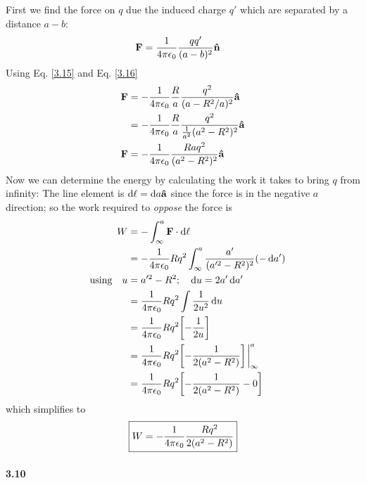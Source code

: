 \documentclass[../main.tex]{subfiles}
\begin{document}
\begin{itemize}
    First we find the force on $q$ due the induced charge $q'$ which are separated by a distance $a - b$:
    \begin{align*}
        \vb F &= \frac{1}{4\pi\epsilon_0} \frac{qq'}{(a - b)^2} \vu n
    \end{align*}
    Using Eq. \eqref{3.15} and Eq. \eqref{3.16}
    \begin{align*}
        \vb F &= -\frac{1}{4\pi\epsilon_0} \frac{R}{a} \frac{q^2}{(a - R^2 / a)^2} \vu a \\ 
        &= -\frac{1}{4\pi\epsilon_0} \frac{R}{a} \frac{q^2}{\frac{1}{a^2} (a^2 - R^2)^2} \vu a \\
        \vb F &= -\frac{1}{4\pi\epsilon_0} \frac{Raq^2}{(a^2 - R^2)^2} \vu a
    \end{align*}
    Now we can determine the energy by calculating the work it takes to bring $q$ from infinity:
    The line element is $\dd \ell = \dd a \vu a$ since the force is in the negative $a$ direction;
    so the work required to \textit{oppose} the force is
    \begin{align*}
        W &= -\int_\infty^a \vb F \cdot \dd\ell \\
        &= -\ke Rq^2 \int_\infty^a \frac{a'}{(a'^2 - R^2)^2} (-\dd{a'}) \\
        \qusing u &= a'^2 - R^2; \quad \dd{u} = 2a' \dd{a'} \\
        &= \ke Rq^2 \int \frac{1}{2u^2} \dd{u} \\
        &= \ke Rq^2 \qt[
            -\frac{1}{2u}
        ] \\
        &= \ke Rq^2 \qt[
            -\frac{1}{2(a^2 - R^2)}
        ] \eval_\infty^a \\
        &= \ke Rq^2 \qt[
            -\frac{1}{2(a^2 - R^2)} - 0
        ]
    \end{align*}
    which simplifies to
    \begin{align*}
        \boxed{
            W = -\frac{1}{4\pi\epsilon_0} \frac{Rq^2}{2(a^2 - R^2)}
        }
    \end{align*}
\end{itemize}

\newpage
\paragraph{3.10}
\end{document}
